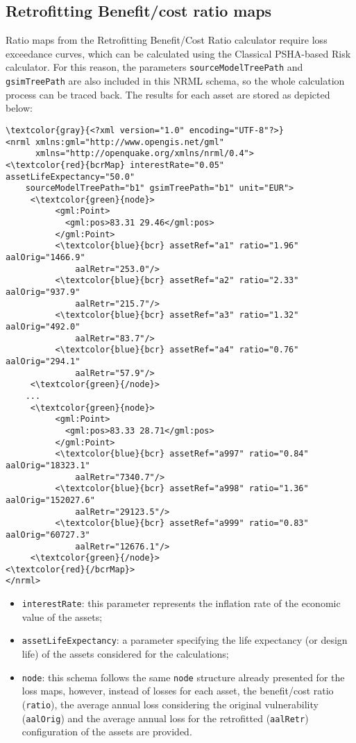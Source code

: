 \subsection{Retrofitting Benefit/cost ratio maps}
Ratio maps from the Retrofitting Benefit/Cost Ratio calculator require loss exceedance curves, which can be calculated using the Classical PSHA-based Risk calculator. For this reason, the parameters \Verb+sourceModelTreePath+ and \Verb+gsimTreePath+ are also included in this NRML schema, so the whole calculation process can be traced back. The results for each \gls{asset} are stored as depicted below:

\begin{Verbatim}[frame=single, commandchars=\\\{\}, samepage=false]
\textcolor{gray}{<?xml version="1.0" encoding="UTF-8"?>}
<nrml xmlns:gml="http://www.opengis.net/gml"
      xmlns="http://openquake.org/xmlns/nrml/0.4">
<\textcolor{red}{bcrMap} interestRate="0.05" assetLifeExpectancy="50.0"
    sourceModelTreePath="b1" gsimTreePath="b1" unit="EUR">
     <\textcolor{green}{node}>
          <gml:Point>
            <gml:pos>83.31 29.46</gml:pos>
          </gml:Point>
          <\textcolor{blue}{bcr} assetRef="a1" ratio="1.96" aalOrig="1466.9"
              aalRetr="253.0"/>
          <\textcolor{blue}{bcr} assetRef="a2" ratio="2.33" aalOrig="937.9"
              aalRetr="215.7"/>
          <\textcolor{blue}{bcr} assetRef="a3" ratio="1.32" aalOrig="492.0"
              aalRetr="83.7"/>
          <\textcolor{blue}{bcr} assetRef="a4" ratio="0.76" aalOrig="294.1"
              aalRetr="57.9"/>
     <\textcolor{green}{/node}>
    ...
     <\textcolor{green}{node}>
          <gml:Point>
            <gml:pos>83.33 28.71</gml:pos>
          </gml:Point>
          <\textcolor{blue}{bcr} assetRef="a997" ratio="0.84" aalOrig="18323.1"
              aalRetr="7340.7"/>
          <\textcolor{blue}{bcr} assetRef="a998" ratio="1.36" aalOrig="152027.6"
              aalRetr="29123.5"/>
          <\textcolor{blue}{bcr} assetRef="a999" ratio="0.83" aalOrig="60727.3"
              aalRetr="12676.1"/>
     <\textcolor{green}{/node}>
<\textcolor{red}{/bcrMap}>
</nrml>
\end{Verbatim}

\begin{itemize}
\item  \Verb+interestRate+: this parameter represents the inflation rate of the economic value of the \glspl{asset};
\item  \Verb+assetLifeExpectancy+: a parameter specifying the life expectancy (or design life) of the \glspl{asset} considered for the calculations;
\item  \Verb+node+: this schema follows the same \Verb+node+ structure already presented for the loss maps, however, instead of losses for each \gls{asset}, the benefit/cost ratio (\Verb+ratio+), the average annual loss considering the original vulnerability (\Verb+aalOrig+) and the average annual loss for the retrofitted (\Verb+aalRetr+) configuration  of the \glspl{asset} are provided.
\end{itemize}

